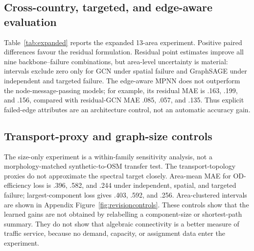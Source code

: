 \documentclass[11pt]{article}
\begin{document}
\subsection{Cross-country, targeted, and edge-aware evaluation}
Table~\ref{tab:expanded} reports the expanded 13-area experiment. Positive
paired differences favour the residual formulation. Residual point estimates
improve all nine backbone--failure combinations, but area-level uncertainty is
material: intervals exclude zero only for GCN under spatial failure and
GraphSAGE under independent and targeted failure. The edge-aware MPNN does not
outperform the node-message-passing models; for example, its residual MAE is
.163, .199, and .156, compared with residual-GCN MAE .085, .057, and .135.
Thus explicit failed-edge attributes are an architecture control, not an
automatic accuracy gain.

\begin{table}[H]
\centering\small
\caption{Expanded zero-shot OSM paired improvement (direct minus residual
MAE), area mean [95\% hierarchical interval].}
\label{tab:expanded}
\end{table}

\subsection{Transport-proxy and graph-size controls}
The size-only experiment is a within-family sensitivity analysis, not a
morphology-matched synthetic-to-OSM transfer test.
The transport-topology proxies do not approximate the spectral target closely.
Area-mean MAE for OD-efficiency loss is .396, .582, and .244 under independent,
spatial, and targeted failure; largest-component loss gives .403, .592, and
.256. Area-clustered intervals are shown in Appendix Figure~\ref{fig:revisioncontrols}.
These controls show that the learned gains are not obtained by relabelling a
component-size or shortest-path summary. They do not show that algebraic
connectivity is a better measure of traffic service, because no demand,
capacity, or assignment data enter the experiment.
\end{document}

